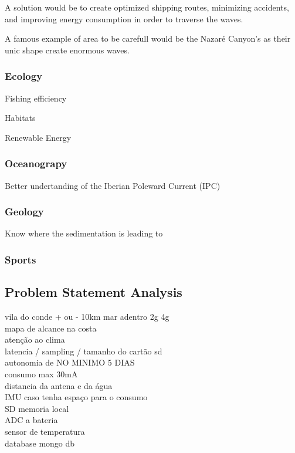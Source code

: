 A solution would be to create optimized shipping routes, minimizing accidents, and improving energy consumption
in order to traverse the waves.

A famous example of area to be carefull would be the Nazaré Canyon’s as their unic shape
create enormous waves.

\subsubsection{Ecology}

Fishing efficiency

Habitats

Renewable Energy 

\subsubsection{Oceanograpy}
Better undertanding of the Iberian Poleward Current (IPC)

\subsubsection{Geology}

Know where the sedimentation is leading to
\subsubsection{Sports}

\subsection{Problem Statement Analysis}

vila do conde + ou - 10km mar adentro 2g 4g\\

mapa de alcance na costa\\

atenção ao clima \\

latencia / sampling / tamanho do cartão sd\\ 
autonomia de NO MINIMO 5 DIAS \\
    consumo max 30mA \\
distancia da antena e da água \\
IMU caso tenha espaço para o consumo \\
SD memoria local \\
ADC a bateria \\
sensor de temperatura \\
database mongo db \\
